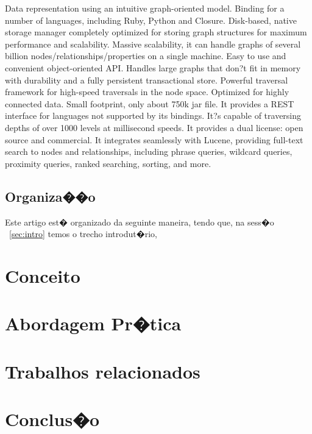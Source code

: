 \documentclass[12pt]{article}
\begin{document}
Data representation using an intuitive graph-oriented model.
Binding for a number of languages, including Ruby, Python and Closure.
Disk-based, native storage manager completely optimized for storing graph structures for maximum performance and scalability.
Massive scalability, it can handle graphs of several billion nodes/relationships/properties on a single machine.
Easy to use and convenient object-oriented API.
Handles large graphs that don?t fit in memory with durability and a fully persistent transactional store.
Powerful traversal framework for high-speed traversals in the node space.
Optimized for highly connected data.
Small footprint, only about 750k jar file.
It provides a REST interface for languages not supported by its bindings.
It?s capable of traversing depths of over 1000 levels at millisecond speeds.
It provides a dual license: open source and commercial.
It integrates seamlessly with Lucene, providing full-text search to nodes and relationships, including phrase queries, wildcard queries, proximity queries, ranked searching, sorting, and more.





\subsection{Organiza��o}\label{sec:org}

Este artigo est� organizado da seguinte maneira, tendo que, na sess�o ~\ref{sec:intro} temos o trecho introdut�rio, 


\section{Conceito}\label{sec:concept}


\section{Abordagem Pr�tica}\label{sec:pratica}


\section{Trabalhos relacionados}\label{sec:rel}


\section{Conclus�o}\label{sec:con}
\end{document}
